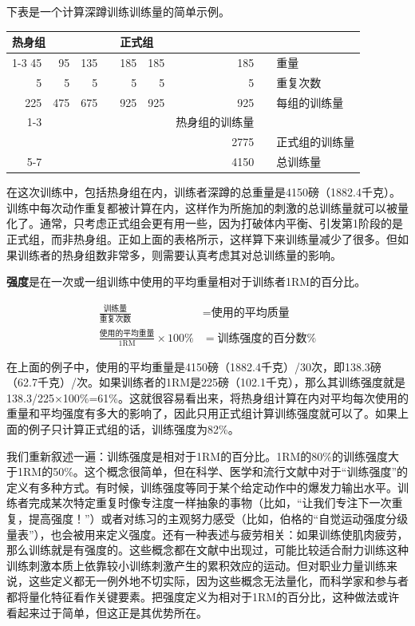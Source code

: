 下表是一个计算深蹲训练训练量的简单示例。

\begin{table}[htbp]
    \centering
    \begin{tabular}{rrr c rrr c l}
        \multicolumn{3}{l}{热身组} & & \multicolumn{3}{l}{正式组} & & \\
        \cline{1-3} \cline{5-7} %
        45 & 95 & 135 & & 185 & 185 & 185 & & 重量 \\
        5 & 5 & 5 & & 5 & 5 & 5 & & 重复次数 \\
        225 & 475 & 675 & & 925 & 925 & 925 & & 每组的训练量 \\
        \cline{1-3} \cline{5-7} %
        \multicolumn{3}{r}{1375} & & & & & & 热身组的训练量 \\
        & & & & \multicolumn{3}{r}{2775} & & 正式组的训练量 \\
        \cline{5-7} %
        & & & & \multicolumn{3}{r}{4150} & & 总训练量 \\
    \end{tabular}
\end{table}

在这次训练中，包括热身组在内，训练者深蹲的总重量是4150磅（1882.4千克）。训练中每次动作重复都被计算在内，这样作为所施加的刺激的总训练量就可以被量化了。通常，只考虑正式组会更有用一些，因为打破体内平衡、引发第1阶段的是正式组，而非热身组。正如上面的表格所示，这样算下来训练量减少了很多。但如果训练者的热身组数非常多，则需要认真考虑其对总训练量的影响。

\textbf{强度}是在一次或一组训练中使用的平均重量相对于训练者1RM的百分比。

\begin{align*}
    \frac{\text{训练量}}{\text{重复次数}} &= \text{使用的平均质量}\\
    \frac{\text{使用的平均重量}}{1\text{RM}}\times 100\% &= \text{训练强度的百分数}\%
\end{align*}

在上面的例子中，使用的平均重量是4150磅（1882.4千克）/30次，即138.3磅（62.7千克）/次。如果训练者的1RM是225磅（102.1千克），那么其训练强度就是138.3/225×100\%=61\%。这就很容易看出来，将热身组计算在内对平均每次使用的重量和平均强度有多大的影响了，因此只用正式组计算训练强度就可以了。如果上面的例子只计算正式组的话，训练强度为82\%。

我们重新叙述一遍：训练强度是相对于1RM的百分比。1RM的80\%的训练强度大于1RM的50\%。这个概念很简单，但在科学、医学和流行文献中对于“训练强度”的定义有多种方式。有时候，训练强度等同于某个给定动作中的爆发力输出水平。训练者完成某次特定重复时像专注度一样抽象的事物（比如，“让我们专注下一次重复，提高强度！”）或者对练习的主观努力感受（比如，伯格的“自觉运动强度分级量表”），也会被用来定义强度。还有一种表述与疲劳相关：如果训练使肌肉疲劳，那么训练就是有强度的。这些概念都在文献中出现过，可能比较适合耐力训练这种训练刺激本质上依靠较小训练刺激产生的累积效应的运动。但对职业力量训练来说，这些定义都无一例外地不切实际，因为这些概念无法量化，而科学家和参与者都将量化特征看作关键要素。把强度定义为相对于1RM的百分比，这种做法或许看起来过于简单，但这正是其优势所在。

